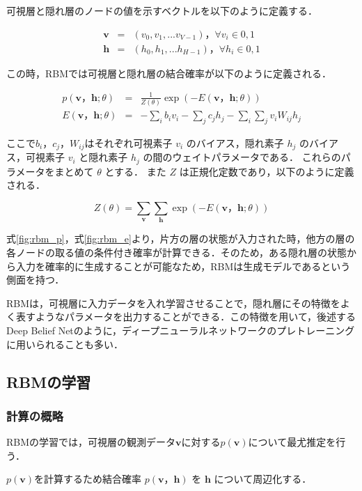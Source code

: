 可視層と隠れ層のノードの値を示すベクトルを以下のように定義する．

\begin{eqnarray}
	\bm{v} & = & (v_0,v_1,...v_{V-1} )， \forall v_i \in {0,1} \\
	\bm{h} & = & (h_0,h_1,...h_{H-1} )， \forall h_i \in {0,1}
\end{eqnarray}

この時，RBMでは可視層と隠れ層の結合確率が以下のように定義される．

\begin{eqnarray}
	p(\bm{v}， \bm{h}; \theta) & = & \frac{1}{Z(\theta)}  \exp (-E(\bm{v}，\bm{h};\theta)) \label{fig:rbm_p}\\
	E(\bm{v}， \bm{h}; \theta) & = & -\sum_i b_i v_i - \sum_j c_j h_j- \sum_i \sum_j v_i W_{ij} h_j \label{fig:rbm_e}
\end{eqnarray}

ここで$b_i，c_j，W_{ij}$はそれぞれ可視素子 $v_i$ のバイアス，隠れ素子 $ h_j $ のバイアス，可視素子 $ v_i $ と隠れ素子 $ h_j $ の間のウェイトパラメータである．
これらのパラメータをまとめて $ \theta $ とする．
また $ Z $ は正規化定数であり，以下のように定義される．

\begin{equation}
	Z(\theta)= \sum_{\bm{v}} \sum_{\bm{h}} \exp (-E(\bm{v}， \bm{h}; \theta))
\end{equation}

式\ref{fig:rbm_p}，式\ref{fig:rbm_e}より，片方の層の状態が入力された時，他方の層の各ノードの取る値の条件付き確率が計算できる．そのため，ある隠れ層の状態から入力を確率的に生成することが可能なため，RBMは生成モデルであるという側面を持つ．

RBMは，可視層に入力データを入れ学習させることで，隠れ層にその特徴をよく表すようなパラメータを出力することができる\cite{hinton2006reducing}．この特徴を用いて，後述するDeep Belief Netのように，ディープニューラルネットワークのプレトレーニングに用いられることも多い．

\subsection{RBMの学習}\label{sec:learn}
\subsubsection{計算の概略}
RBMの学習では，可視層の観測データ$\bm{v}$に対する$p(\bm{v})$について最尤推定を行う．

$p(\bm{v})$を計算するため結合確率 $p(\bm{v}，\bm{h})$ を $\bm{h}$ について周辺化する．


